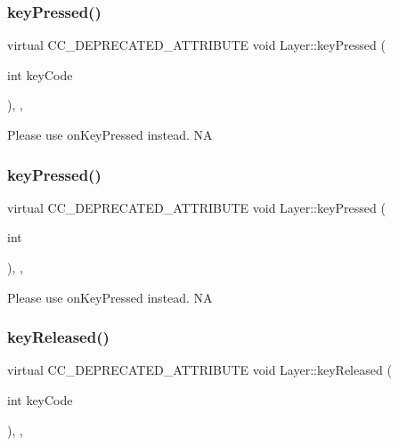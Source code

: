 \subsubsection{\texorpdfstring{key\+Pressed()}{keyPressed()}\hspace{0.1cm}{\footnotesize\ttfamily [1/2]}}
{\footnotesize\ttfamily virtual C\+C\+\_\+\+D\+E\+P\+R\+E\+C\+A\+T\+E\+D\+\_\+\+A\+T\+T\+R\+I\+B\+U\+TE void Layer\+::key\+Pressed (\begin{DoxyParamCaption}\item[{int}]{key\+Code }\end{DoxyParamCaption})\hspace{0.3cm}{\ttfamily [inline]}, {\ttfamily [final]}, {\ttfamily [virtual]}}

Please use on\+Key\+Pressed instead.  NA \mbox{\label{classLayer_aff1ce0d6398816823cabb880461da415}} 
\subsubsection{\texorpdfstring{key\+Pressed()}{keyPressed()}\hspace{0.1cm}{\footnotesize\ttfamily [2/2]}}
{\footnotesize\ttfamily virtual C\+C\+\_\+\+D\+E\+P\+R\+E\+C\+A\+T\+E\+D\+\_\+\+A\+T\+T\+R\+I\+B\+U\+TE void Layer\+::key\+Pressed (\begin{DoxyParamCaption}\item[{int}]{ }\end{DoxyParamCaption})\hspace{0.3cm}{\ttfamily [inline]}, {\ttfamily [final]}, {\ttfamily [virtual]}}

Please use on\+Key\+Pressed instead.  NA \mbox{\label{classLayer_acf527c64c7817cffc979507b4888d71a}} 
\subsubsection{\texorpdfstring{key\+Released()}{keyReleased()}\hspace{0.1cm}{\footnotesize\ttfamily [1/2]}}
{\footnotesize\ttfamily virtual C\+C\+\_\+\+D\+E\+P\+R\+E\+C\+A\+T\+E\+D\+\_\+\+A\+T\+T\+R\+I\+B\+U\+TE void Layer\+::key\+Released (\begin{DoxyParamCaption}\item[{int}]{key\+Code }\end{DoxyParamCaption})\hspace{0.3cm}{\ttfamily [inline]}, {\ttfamily [final]}, {\ttfamily [virtual]}}

